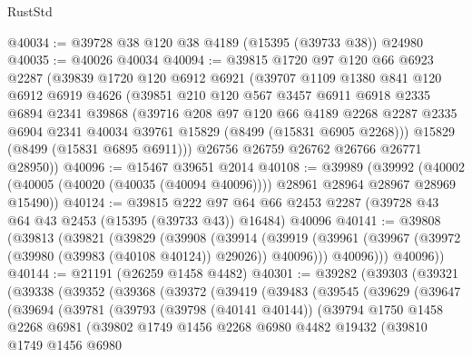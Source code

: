 \begin{lexlean}{RustStd}
\begin{coremodule}
@40034 := @39728 @38 @120 @38 @4189 (@15395 (@39733 @38)) @24980
@40035 := @40026 @40034
@40094 := @39815
    @1720
    @97
    @120
    @66
    @6923
    @2287
    (@39839
      @1720
      @120
      @6912
      @6921
      (@39707
        @1109
        @1380
        @841
        @120
        @6912
        @6919
        @4626
        (@39851
          @210
          @120
          @567
          @3457
          @6911
          @6918
          @2335
          @6894
          @2341
          @39868
          (@39716
            @208
            @97
            @120
            @66
            @4189
            @2268
            @2287
            @2335
            @6904
            @2341
            @40034
            @39761
            @15829
            (@8499 (@15831 @6905 @2268)))
          @15829
          (@8499 (@15831 @6895 @6911)))
        @26756
        @26759
        @26762
        @26766
        @26771
        @28950))
@40096 := @15467 @39651 @2014
@40108 := @39989
    (@39992 (@40002 (@40005 (@40020 (@40035 (@40094 @40096)))) @28961 @28964 @28967 @28969 @15490))
@40124 := @39815
    @222
    @97
    @64
    @66
    @2453
    @2287
    (@39728 @43 @64 @43 @2453 (@15395 (@39733 @43)) @16484)
    @40096
@40141 := @39808
    (@39813
      (@39821
        (@39829
          (@39908
            (@39914
              (@39919 (@39961 (@39967 (@39972 (@39980 (@39983 (@40108 @40124)) @29026)) @40096)))
              @40096)))
        @40096))
@40144 := @21191 (@26259 @1458 @4482)
@40301 := @39282
    (@39303
      (@39321
        (@39338
          (@39352
            (@39368
              (@39372
                (@39419
                  (@39483
                    (@39545
                      (@39629
                        (@39647
                          (@39694
                            (@39781
                              (@39793
                                (@39798 (@40141 @40144))
                                (@39794
                                  @1750
                                  @1458
                                  @2268
                                  @6981
                                  (@39802
                                    @1749
                                    @1456
                                    @2268
                                    @6980
                                    @4482
                                    @19432
                                    (@39810
                                      @1749
                                      @1456
                                      @6980

\end{coremodule}
\end{lexlean}
